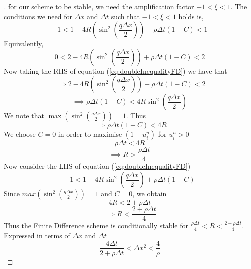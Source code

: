 \documentclass[a4paper]{article}
\begin{document}
\begin{proof}[]
	    for our scheme to be stable, we need  the amplification factor $-1<\xi<1$. The conditions we need for $\Delta x $ and $ \Delta t$ such that $-1<\xi<1$ holds is,
	    \begin{equation*}
	        -1 < 1 - 4R(\sin^{2}(\frac{q\Delta x}{2}) ) + \rho \Delta t (1 - C) < 1
	    \end{equation*}
	    Equivalently,
	    \begin{equation}\label{eq:doubleInequalityFD}
	        0 < 2 - 4R(\sin^{2}(\frac{q\Delta x}{2}) ) + \rho \Delta t (1 - C) < 2
	    \end{equation}
	    Now taking the RHS of equation (\ref{eq:doubleInequalityFD}) we have that 
	    \begin{equation*}
	        \implies 2 -4R(\sin^{2}(\frac{q \Delta x}{2})) + \rho\Delta t(1 - C) < 2
	    \end{equation*}
	    \begin{equation*}
	        \implies \rho \Delta t (1-C) < 4R\sin^{2}(\frac{q\Delta x}{2})
	    \end{equation*}
	     We note that $\max(\sin^{2}(\frac{q\Delta x}{2})) = 1$. Thus 
	     \begin{equation*}
	       \implies \rho\Delta t(1 - C) < 4R 
	     \end{equation*}
	     We choose $C=0$ in order to maximise $(1-u_{i}^{n})$ for $u_{i}^{n}>0$
	     \begin{equation*}
	         \rho\Delta t < 4R
	     \end{equation*}
	     \begin{equation*}
	         \implies R >\frac{\rho\Delta t}{4}
	     \end{equation*}
	     Now consider the LHS of equation (\ref{eq:doubleInequalityFD})
	     \begin{equation*}
	         -1 < 1 - 4R\sin^{2}(\frac{q\Delta x}{2}) + \rho\Delta t(1 -C)
	     \end{equation*}
	     Since $max(\sin^{2}(\frac{q\Delta x}{2})) = 1$ and $C = 0$, we obtain
	     \begin{equation*}
	      4R < 2 + \rho\Delta t
	     \end{equation*}
	     \begin{equation*}
	         \implies R< \frac{2 + \rho\Delta t}{4}
	     \end{equation*}
	     Thus the Finite Difference scheme is conditionally stable for $\frac{\rho \Delta t}{4} < R < \frac{2 + \rho\Delta t}{4}$. Expressed in terms of $\Delta x$ and $\Delta t$
	     \begin{equation}\label{eq:finiteDifferenceStability}
	         \frac{4 \Delta t}{2+\rho \Delta t} < \Delta x^2 < \frac{4}{\rho}
	     \end{equation}
	\end{proof}
\end{document}
